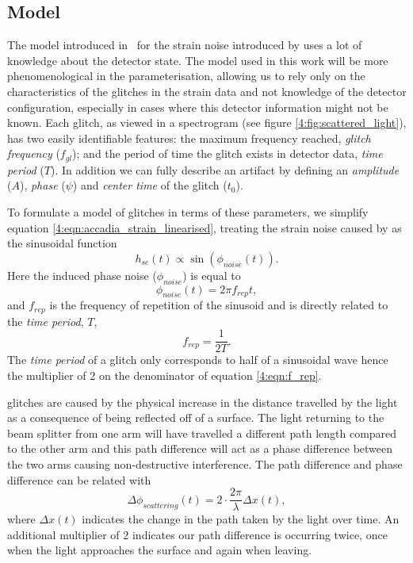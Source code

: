 \subsection{Model}

The model introduced in~\cite{TAccadia:2010} for the \gw{} strain noise introduced by \scl{} uses a lot of knowledge about the detector state. The model used in this work will be more phenomenological in the parameterisation, allowing us to rely only on the characteristics of the glitches in the strain data and not knowledge of the detector configuration, especially in cases where this detector information might not be known. Each \scl{} glitch, as viewed in a spectrogram (see figure \ref{4:fig:scattered_light}), has two easily identifiable features: the maximum frequency reached, \emph{glitch frequency} ($f_{gl}$); and the period of time the glitch exists in detector data, \emph{time period} ($T$).  In addition we can fully describe an artifact by defining an \emph{amplitude} ($A$), \emph{phase} ($\psi$) and \emph{center time} of the glitch ($t_0$).

To formulate a model of \scl{} glitches in terms of these parameters, we simplify equation \ref{4:eqn:accadia_strain_linearised}, treating the strain noise caused by \scl{} as the sinusoidal function
%
\begin{equation}
  h_{sc}(t) \propto \sin(\phi_{noise}(t)).
  \label{4:eqn:h_sc_initial}
\end{equation}
%
Here the induced phase noise ($\phi_{noise}$) is equal to 
%
\begin{equation}
    \phi_{noise}(t) = 2 \pi f_{rep} t,
     \label{4:eqn:phi_noise}
\end{equation}
%
and $f_{rep}$ is the frequency of repetition of the sinusoid and is directly related to the \emph{time period}, $T$,
%
\begin{equation}
  f_{rep} = \frac{1}{2 T}.
  \label{4:eqn:f_rep}
\end{equation}
%
The \emph{time period} of a \scl{} glitch only corresponds to half of a sinusoidal wave hence the multiplier of 2 on the denominator of equation \ref{4:eqn:f_rep}.

\Scl{} glitches are caused by the physical increase in the distance travelled by the light as a consequence of being reflected off of a surface. The light returning to the beam splitter from one arm will have travelled a different path length compared to the other arm and this path difference will act as a phase difference between the two arms causing non-destructive interference. The path difference and phase difference can be related with
%
\begin{equation}
  \Delta \phi_{scattering}(t) = 2 \cdot \frac{2 \pi}{\lambda} \Delta x(t),
  \label{4:eqn:delta_phi_scat}
\end{equation}
%
where $\Delta x(t)$ indicates the change in the path taken by the light over time. An additional multiplier of 2 indicates our path difference is occurring twice, once when the light approaches the surface and again when leaving.

